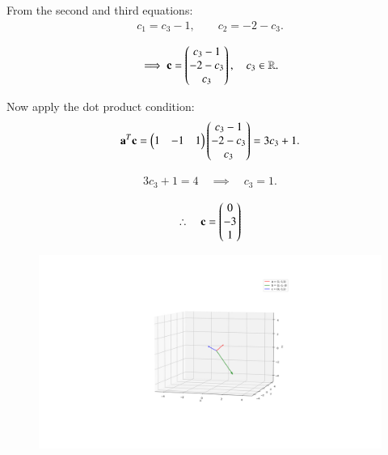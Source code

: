 \documentclass[journal]{IEEEtran}
\begin{document}
From the second and third equations:
\begin{align}
c_1 = c_3 - 1, \qquad c_2 = -2 - c_3.
\end{align}

\begin{align}
\implies 
\mathbf{c} = \begin{pmatrix}c_3-1 \\ -2-c_3 \\ c_3\end{pmatrix}, \quad c_3\in\mathbb{R}.
\end{align}

Now apply the dot product condition:
\begin{align}
\mathbf{a}^T\mathbf{c} = \begin{pmatrix}1 & -1 & 1\end{pmatrix}\begin{pmatrix}c_3-1 \\ -2-c_3 \\ c_3\end{pmatrix} = 3c_3+1.
\end{align}

\begin{align}
3c_3+1=4 \quad \implies \quad c_3=1.
\end{align}

\begin{align}
\therefore \quad \mathbf{c} = \begin{pmatrix}0 \\ -3 \\ 1\end{pmatrix}
\end{align}

\begin{figure}[H]
    \centering
    \includegraphics[width=1\columnwidth]{figs/plot4.png}
    \caption{}
    \label{fig:placeholder}
\end{figure}
\end{document}
